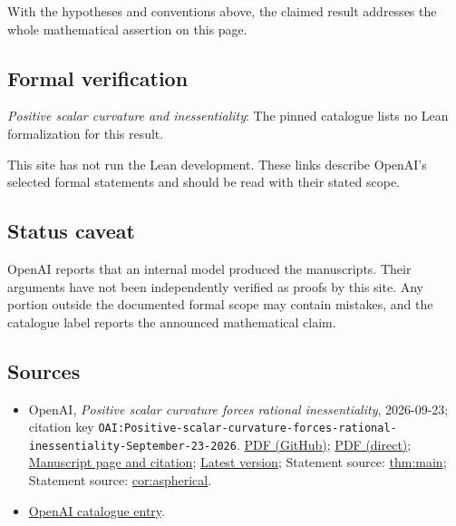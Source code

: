 \documentclass[11pt]{article}
\begin{document}
With the hypotheses and conventions above, the claimed result addresses the whole mathematical assertion on this page.

\subsection{Formal verification}
\textit{Positive scalar curvature and inessentiality}: The pinned catalogue lists no Lean formalization for this result.

This site has not run the Lean development. These links describe OpenAI’s selected formal statements and should be read with their stated scope.

\subsection{Status caveat}
OpenAI reports that an internal model produced the manuscripts. Their arguments have not been independently verified as proofs by this site. Any portion outside the documented formal scope may contain mistakes, and the catalogue label reports the announced mathematical claim.

\subsection{Sources}
\begin{itemize}
\item OpenAI, \emph{Positive scalar curvature forces rational inessentiality}, 2026-09-23; citation key \texttt{OAI:Positive-scalar-curvature-forces-rational-inessentiality-September-23-2026}. \href{https://github.com/openai/math/blob/adc7f1241b42e322a6451854ab7e4b4c146bf78a/preprints/Positive-scalar-curvature-forces-rational-inessentiality-September-23-2026/paper.pdf}{PDF (GitHub)}; \href{https://github.com/openai/math/raw/adc7f1241b42e322a6451854ab7e4b4c146bf78a/preprints/Positive-scalar-curvature-forces-rational-inessentiality-September-23-2026/paper.pdf}{PDF (direct)}; \href{https://github.com/openai/math/blob/adc7f1241b42e322a6451854ab7e4b4c146bf78a/preprints/Positive-scalar-curvature-forces-rational-inessentiality-September-23-2026/README.md}{Manuscript page and citation}; \href{https://github.com/openai/math/blob/main/preprints/Positive-scalar-curvature-forces-rational-inessentiality-September-23-2026/paper.pdf}{Latest version}; Statement source: \href{https://github.com/openai/math/blob/adc7f1241b42e322a6451854ab7e4b4c146bf78a/preprints/Positive-scalar-curvature-forces-rational-inessentiality-September-23-2026/build/sections/01-introduction.tex\#L22}{thm:main}; Statement source: \href{https://github.com/openai/math/blob/adc7f1241b42e322a6451854ab7e4b4c146bf78a/preprints/Positive-scalar-curvature-forces-rational-inessentiality-September-23-2026/build/sections/01-introduction.tex\#L184}{cor:aspherical}.
\item \href{https://github.com/openai/math/blob/adc7f1241b42e322a6451854ab7e4b4c146bf78a/CONTENTS.md}{OpenAI catalogue entry}.
\end{itemize}
\end{document}
